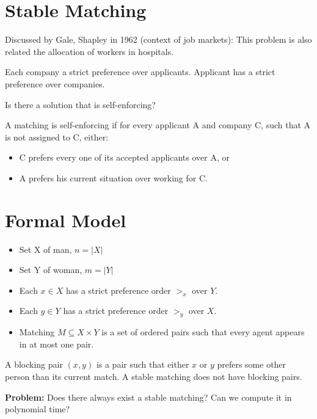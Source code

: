 \section{Stable Matching}

Discussed by Gale, Shapley in 1962 (context of job markets): This problem is also related the allocation of workers in hospitals.

Each company a strict preference over applicants. Applicant has a strict preference over companies.

Is there a solution that is self-enforcing?

\begin{mydefinition}
A matching is self-enforcing if for every applicant A and company C, such that A is not assigned to C, either:
\begin{itemize}
\item C prefers every one of its accepted applicants over A, or 
\item A prefers his current situation over working for C.
\end{itemize}
\end{mydefinition}



\section{Formal Model}

\begin{itemize}
\item Set X of man, 	$n = |X|$

\item Set Y of woman,	$m = |Y|$

\item Each $x \in X$ has a strict preference order $>_x$ over $Y$.

\item Each $y \in Y$ has a strict preference order $>_y$ over $X$.

\item Matching $M \subseteq X \times Y$ is a set of ordered pairs such that
every agent appears in at most one pair.
\end{itemize}

A blocking pair $(x,y)$ is a pair such that either $x$ or $y$ prefers some other person than its current match. A stable matching does not have blocking pairs.

\textbf{Problem:} Does there always exist a stable matching? Can we compute it in polynomial time?

